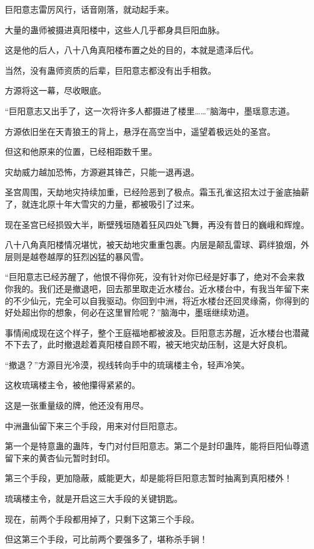 \begin{this_body}
巨阳意志雷厉风行，话音刚落，就动起手来。

大量的蛊师被摄进真阳楼中，这些人几乎都身具巨阳血脉。

这是他的后人，八十八角真阳楼布置之处的目的，本就是遗泽后代。

当然，没有蛊师资质的后辈，巨阳意志都没有出手相救。

方源将这一幕，尽收眼底。

“巨阳意志又出手了，这一次将许多人都摄进了楼里……”脑海中，墨瑶意志道。

方源依旧坐在天青狼王的背上，悬浮在高空当中，遥望着极远处的圣宫。

但这和他原来的位置，已经相距数千里。

灾劫威力越加恐怖，方源避其锋芒，只能一退再退。

圣宫周围，天劫地灾持续加重，已经险恶到了极点。霜玉孔雀这招太过于釜底抽薪了，就连北原十年大雪灾的力量，都被吸引了过来。

现在圣宫已经损毁大半，断壁残垣随着狂风四处飞舞，再没有昔日的巍峨和辉煌。

八十八角真阳楼情况堪忧，被天劫地灾重重包裹。内层是颠乱雷球、羁绊狼烟，外层则是越卷越厚的狂烈凶猛的暴风雪。

“巨阳意志已经苏醒了，他恨不得你死，没有针对你已经是好事了，绝对不会来救你我的。我们还是撤退吧，回去那里取走近水楼台。近水楼台中，有我当年留下来的不少仙元，完全可以自我驱动。你回到中洲，将近水楼台还回灵缘斋，你得到的好处超出你的想象，何必在这里冒险呢？”脑海中，墨瑶继续劝道。

事情闹成现在这个样子，整个王庭福地都被波及。巨阳意志苏醒，近水楼台也潜藏不下去了，此时撤退趁着真阳楼自顾不暇，被天地灾劫压制，这是大好良机。

“撤退？”方源目光冷漠，视线转向手中的琉璃楼主令，轻声冷笑。

这枚琉璃楼主令，被他攥得紧紧的。

这是一张重量级的牌，他还没有用尽。

中洲蛊仙留下来三个手段，用来对付巨阳意志。

第一个是特意蛊的蛊阵，专门对付巨阳意志。第二个是封印蛊阵，能将巨阳仙尊遗留下来的黄杏仙元暂时封印。

第三个手段，更加隐蔽，威能更大，却是能将巨阳意志暂时抽离到真阳楼外！

琉璃楼主令，就是开启这三大手段的关键钥匙。

现在，前两个手段都用掉了，只剩下这第三个手段。

但这第三个手段，可比前两个要强多了，堪称杀手锏！


\end{this_body}

